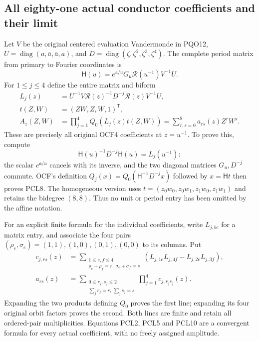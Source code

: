 \documentclass[11pt,a4paper]{article}
\begin{document}
\subsection{All eighty-one actual conductor coefficients and their limit}
Let $V$ be the original centered evaluation Vandermonde in PQO12,
$U=\operatorname{diag}(a,\bar a,\bar a,a)$, and
$D=\operatorname{diag}(\zeta,\zeta^2,\zeta^3,\zeta^4)$.
The complete period matrix from primary to Fourier coordinates is
\[
 \mathsf H(u)=e^{\mathfrak a/u}G_u\mathcal R(u^{-1})V^{-1}U.
 \tag{PCL7}
\]
For $1\le j\le4$ define the entire matrix and biform
\[
 \begin{split}
 L_j(z)&=U^{-1}V\mathcal R(z)^{-1}D^{-j}
                              \mathcal R(z)V^{-1}U,\\
 t(Z,W)&=(ZW,Z,W,1)^{\mathsf T},\\
 A_z(Z,W)&=\prod_{j=1}^4 Q_0(L_j(z)t(Z,W))
                  =\sum_{r,s=0}^8 a_{rs}(z)Z^rW^s.
 \end{split}\tag{PCL8}
\]
These are precisely all original OCF4 coefficients at $z=u^{-1}$.
To prove this, compute
\[
 \mathsf H(u)^{-1}D^{-j}\mathsf H(u)=L_j(u^{-1}):
 \tag{PCL9}
\]
the scalar $e^{\mathfrak a/u}$ cancels with its inverse, and the
two diagonal matrices $G_u,D^{-j}$ commute. OCF's definition
$Q_j(x)=Q_0(\mathsf H^{-1}D^{-j}x)$ followed by $x=\mathsf Ht$
then proves PCL8. The homogeneous version uses
$t=(z_0w_0,z_0w_1,z_1w_0,z_1w_1)$ and retains the bidegree
$(8,8)$. Thus no unit or period entry has been omitted by the
affine notation.

For an explicit finite formula for the individual coefficients,
write $L_{j,b e}$ for a matrix entry, and associate the four pairs
$(\rho_e,\sigma_e)=(1,1),(1,0),(0,1),(0,0)$ to its columns.
Put
\[
 \begin{split}
 c_{j,rs}(z)&=
 \sum_{\substack{1\le e,f\le4\\
       \rho_e+\rho_f=r,\ \sigma_e+\sigma_f=s}}
 (L_{j,1e}L_{j,4f}-L_{j,2e}L_{j,3f}),\\
 a_{rs}(z)&=
 \sum_{\substack{0\le r_j,s_j\le2\\
             \sum_jr_j=r,\ \sum_js_j=s}}
                       \prod_{j=1}^4c_{j,r_js_j}(z).
 \end{split}\tag{PCL10}
\]
Expanding the two products defining $Q_0$ proves the first line;
expanding its four original orbit factors proves the second.
Both lines are finite and retain all ordered-pair multiplicities.
Equations PCL2, PCL5 and PCL10 are a convergent formula for every
actual coefficient, with no freely assigned amplitude.
\end{document}
